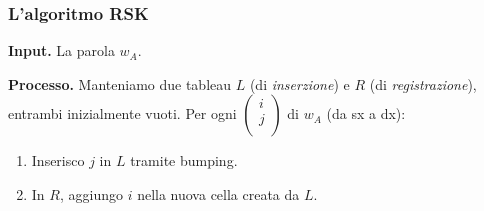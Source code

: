 \subsubsection{L'algoritmo RSK}

\textbf{Input.} La parola $ w_A $.

\textbf{Processo.} Manteniamo due tableau $ L $ (di \textit{inserzione}) e $ R $ (di \textit{registrazione}), entrambi inizialmente vuoti. Per ogni $ \begin{pmatrix}
i\\
j\\
\end{pmatrix} $ di $ w_A $ (da sx a dx):
\begin{enumerate}
  \item Inserisco $ j $ in $ L $ tramite bumping.
  \item In $ R $, aggiungo $ i $ nella nuova cella creata da $ L $.
\end{enumerate}

